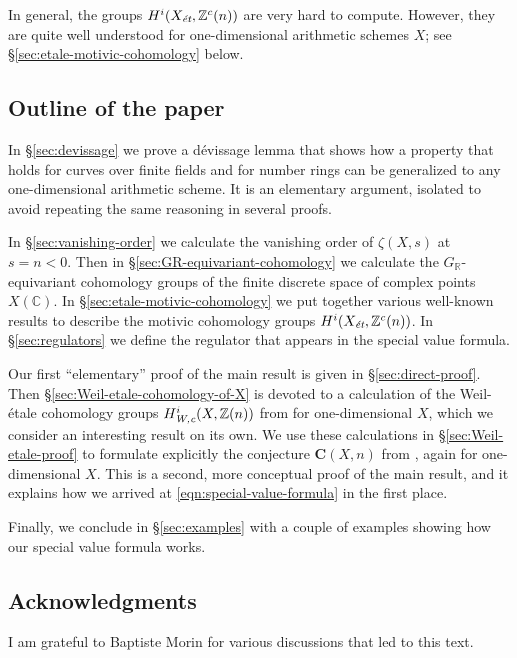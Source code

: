 \documentclass[draft]{article}
\newcommand{\CC}{\mathbb{C}}
\newcommand{\RR}{\mathbb{R}}
\newcommand{\ZZ}{\mathbb{Z}}
\newcommand{\et}{\text{\it \'{e}t}}
\newcommand{\Wc}{\text{\it W,c}}
\theoremstyle{myplain}
\theoremstyle{mydefinition}
\begin{document}
In general, the groups $H^i (X_\et, \ZZ^c (n))$ are very hard to
compute. However, they are quite well understood for one-dimensional arithmetic
schemes $X$; see \S\ref{sec:etale-motivic-cohomology} below.

\subsection*{Outline of the paper}

In \S\ref{sec:devissage} we prove a d\'{e}vissage lemma that shows how a
property that holds for curves over finite fields and for number rings can be
generalized to any one-dimensional arithmetic scheme. It is an elementary
argument, isolated to avoid repeating the same reasoning in several proofs.

In \S\ref{sec:vanishing-order} we calculate the vanishing order of $\zeta (X,s)$
at $s = n < 0$. Then in \S\ref{sec:GR-equivariant-cohomology} we calculate the
$G_\RR$-equivariant cohomology groups of the finite discrete space of complex
points $X(\CC)$. In \S\ref{sec:etale-motivic-cohomology} we put together various
well-known results to describe the motivic cohomology groups
$H^i (X_\et, \ZZ^c(n))$. In \S\ref{sec:regulators} we define the regulator that
appears in the special value formula.

Our first ``elementary'' proof of the main result is given in
\S\ref{sec:direct-proof}. Then \S\ref{sec:Weil-etale-cohomology-of-X} is devoted
to a calculation of the Weil-\'{e}tale cohomology groups $H^i_\Wc (X, \ZZ(n))$
from \cite{Beshenov-Weil-etale-1} for one-dimensional $X$, which we consider an
interesting result on its own. We use these calculations in
\S\ref{sec:Weil-etale-proof} to formulate explicitly the conjecture
$\mathbf{C} (X,n)$ from \cite{Beshenov-Weil-etale-2}, again for one-dimensional
$X$. This is a second, more conceptual proof of the main result, and it explains
how we arrived at \eqref{eqn:special-value-formula} in the first place.

Finally, we conclude in \S\ref{sec:examples} with a couple of examples showing
how our special value formula works.

\subsection*{Acknowledgments}

I am grateful to Baptiste Morin for various discussions that led to this text.

\end{document}
